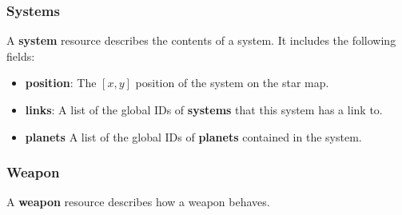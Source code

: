 \documentclass{article}
\begin{document}
\subsubsection{Systems}
A \textbf{system} resource describes the contents of a system. It includes the following fields:
\begin{itemize}
\item{\textbf{position}}: The $[x,y]$ position of the system on the star map.
\item{\textbf{links}}: A list of the global IDs of \textbf{systems} that this system has a link to.
\item{\textbf{planets}} A list of the global IDs of \textbf{planets} contained in the system.
\end{itemize}

\subsubsection{Weapon}
A \textbf{weapon} resource describes how a weapon behaves.
\end{document}
